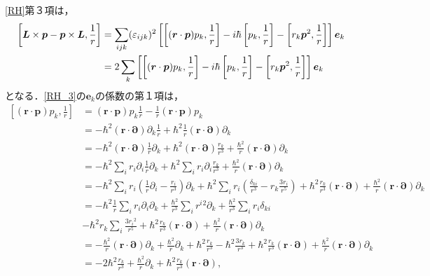 \eqref{RH}第３項は，
\begin{align}
  \left[\boldsymbol{L}\times\boldsymbol{p} - \boldsymbol{p}\times\boldsymbol{L},\frac{1}{r}\right]
  & = \sum_{ijk}(\varepsilon_{ijk})^2\left[\left[(\boldsymbol{r}\cdot\boldsymbol{p})p_k,\frac{1}{r}\right] - i\hbar\left[p_k,\frac{1}{r}\right] - \left[r_k\boldsymbol{p}^2,\frac{1}{r}\right]\right]\boldsymbol{e}_k\notag\\
  & = 2\sum_k\left[\left[(\boldsymbol{r}\cdot\boldsymbol{p})p_k,\frac{1}{r}\right] - i\hbar\left[p_k,\frac{1}{r}\right] - \left[r_k\boldsymbol{p}^2,\frac{1}{r}\right]\right]\boldsymbol{e}_k\label{RH_3}
\end{align}
となる．\eqref{RH_3}の$\boldsymbol{e}_k$の係数の第１項は，
\begin{align*}
  \left[(\boldsymbol{r}\cdot\boldsymbol{p})p_k,\frac{1}{r}\right]
  & = (\boldsymbol{r}\cdot\boldsymbol{p})p_k\frac{1}{r} - \frac{1}{r}(\boldsymbol{r}\cdot\boldsymbol{p})p_k\\
  & = - \hbar^2(\boldsymbol{r}\cdot\boldsymbol{\partial})\partial_k\frac{1}{r} + \hbar^2\frac{1}{r}(\boldsymbol{r}\cdot\boldsymbol{\partial})\partial_k\\
  & = - \hbar^2(\boldsymbol{r}\cdot\boldsymbol{\partial})\frac{1}{r}\partial_k + \hbar^2(\boldsymbol{r}\cdot\boldsymbol{\partial})\frac{r_k}{r^3} + \frac{\hbar^2}{r}(\boldsymbol{r}\cdot\boldsymbol{\partial})\partial_k\\
  & = - \hbar^2\sum_ir_i\partial_i\frac{1}{r}\partial_k + \hbar^2\sum_ir_i\partial_i\frac{r_k}{r^3} + \frac{\hbar^2}{r}(\boldsymbol{r}\cdot\boldsymbol{\partial})\partial_k\\
  & = - \hbar^2\sum_ir_i\left(\frac{1}{r}\partial_i - \frac{r_i}{r^3}\right)\partial_k + \hbar^2\sum_ir_i\left(\frac{\delta_{ki}}{r^3} - r_k\frac{3r_i}{r^5}\right) + \hbar^2\frac{r_k}{r^3}(\boldsymbol{r}\cdot\boldsymbol{\partial}) + \frac{\hbar^2}{r}(\boldsymbol{r}\cdot\boldsymbol{\partial})\partial_k\\
  & = - \hbar^2\frac{1}{r}\sum_ir_i\partial_i\partial_k + \frac{\hbar^2}{r^3}\sum_ir^i{}^2\partial_k + \frac{\hbar^2}{r^3}\sum_ir_i\delta_{ki} \\
  & - \hbar^2r_k\sum_i\frac{3r_i{}^2}{r^5} + \hbar^2\frac{r_k}{r^3}(\boldsymbol{r}\cdot\boldsymbol{\partial}) + \frac{\hbar^2}{r}(\boldsymbol{r}\cdot\boldsymbol{\partial})\partial_k\\
  & = - \frac{\hbar^2}{r}(\boldsymbol{r}\cdot\boldsymbol{\partial})\partial_k + \frac{\hbar^2}{r}\partial_k + \hbar^2\frac{r_k}{r^3} - \hbar^2\frac{3r_k}{r^3} + \hbar^2\frac{r_k}{r^3}(\boldsymbol{r}\cdot\boldsymbol{\partial}) + \frac{\hbar^2}{r}(\boldsymbol{r}\cdot\boldsymbol{\partial})\partial_k\\
  & = - 2\hbar^2\frac{r_k}{r^3} + \frac{\hbar^2}{r}\partial_k + \hbar^2\frac{r_k}{r^3}(\boldsymbol{r}\cdot\boldsymbol{\partial}),
\end{align*}

